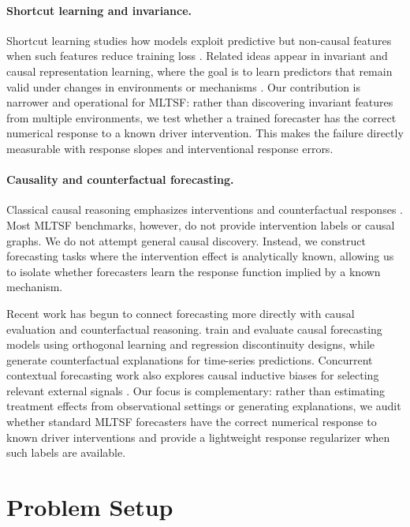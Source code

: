 \documentclass{article}
\begin{document}
\paragraph{Shortcut learning and invariance.}
Shortcut learning studies how models exploit predictive but non-causal features when
such features reduce training loss \citep{geirhos2020shortcut}. Related ideas appear
in invariant and causal representation learning, where the goal is to learn predictors
that remain valid under changes in environments or mechanisms
\citep{arjovsky2019invariant,scholkopf2021toward}. Our contribution is narrower and
operational for MLTSF: rather than discovering invariant features from multiple
environments, we test whether a trained forecaster has the correct numerical response
to a known driver intervention. This makes the failure directly measurable with
response slopes and interventional response errors.

\paragraph{Causality and counterfactual forecasting.}
Classical causal reasoning emphasizes interventions and counterfactual responses
\citep{granger1969investigating,pearl2009causality,peters2017elements}. Most MLTSF
benchmarks, however, do not provide intervention labels or causal graphs. We do not
attempt general causal discovery. Instead, we construct forecasting tasks where the
intervention effect is analytically known, allowing us to isolate whether forecasters
learn the response function implied by a known mechanism.

Recent work has begun to connect forecasting more directly with causal evaluation
and counterfactual reasoning. \citet{crasson2024training} train and evaluate causal
forecasting models using orthogonal learning and regression discontinuity designs,
while \citet{yan2023self} generate counterfactual explanations for time-series
predictions. Concurrent contextual forecasting work also explores causal inductive
biases for selecting relevant external signals \citep{yang2025learning}. Our focus
is complementary: rather than estimating treatment effects from observational
settings or generating explanations, we audit whether standard MLTSF forecasters
have the correct numerical response to known driver interventions and provide a
lightweight response regularizer when such labels are available.

\section{Problem Setup}
\end{document}
